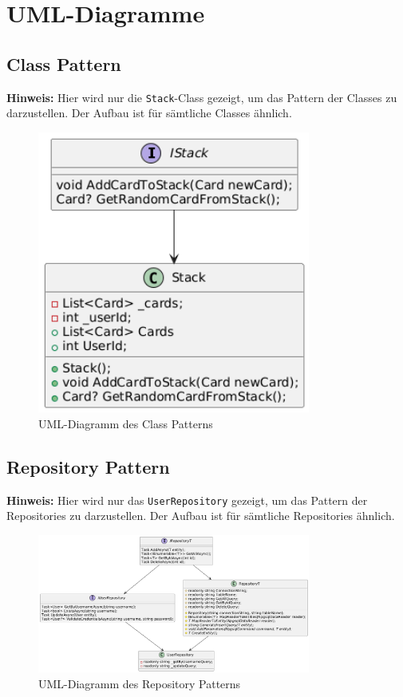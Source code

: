 \documentclass[a4paper, 12pt]{article}
\begin{document}
\pagebreak

\section{UML-Diagramme}

\subsection {Class Pattern}
\noindent\textbf{Hinweis:} Hier wird nur die \texttt{Stack}-Class gezeigt, um das Pattern der Classes zu darzustellen. Der Aufbau ist für sämtliche Classes ähnlich.
\begin{figure}[h!]
\centering
\includegraphics[width=0.8\textwidth]{Class_UML_Example_Stack.png}
\caption{UML-Diagramm des Class Patterns}
\label{fig:repository_pattern}
\end{figure}
\pagebreak

\subsection {Repository Pattern}
\noindent\textbf{Hinweis:} Hier wird nur das \texttt{UserRepository} gezeigt, um das Pattern der Repositories zu darzustellen. Der Aufbau ist für sämtliche Repositories ähnlich.
\begin{figure}[h!]
\centering
\includegraphics[width=0.8\textwidth]{Repository_UML_Example_User.png}
\caption{UML-Diagramm des Repository Patterns}
\label{fig:repository_pattern}
\end{figure}
\pagebreak
\end{document}
